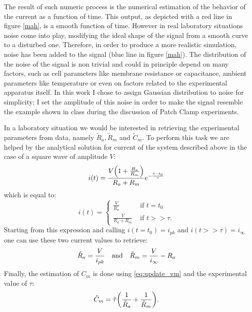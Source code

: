 \documentclass[a4paper]{article}
\begin{document}
The result of such numeric process is the numerical estimation of the behavior of the current as a function of time.
This output, as depicted with a red line in figure \ref{mah}, is a smooth function of time.
However in real laboratory situations noise come into play, modifying the ideal shape of the signal from a smooth curve to a disturbed one.
Therefore, in order to produce a more realistic simulation, noise has been added to the signal (blue line in figure \ref{mah}).
The distribution of the noise of the signal is non trivial and could in principle depend on many factors, such as cell parameters like membrane resistance or capacitance, ambient parameters like temperature or even on factors related to the experimental apparatus itself.
In this work I chose to assign Gaussian distribution to noise for simplicity; I set the amplitude of this noise in order to make the signal resemble the example shown in class during the discussion of Patch Clamp experiments.

In a laboratory situation we would be interested in retrieving the experimental parameters from data, namely $\tilde{R}_a, \tilde{R}_m$ and $\tilde{C}_m.$
To perform this task we are helped by the analytical solution for current of the system described above in the case of a square wave of amplitude $V$:
\begin{equation}
     i(t)=\frac{V\pqty{1+\frac{R_a}{R_m}}}{R_a+R_m} e^{-\frac{t-t_0}{\tau}}
 \end{equation} 
which is equal to:
\begin{equation}
i(t)=
    \begin{cases}
        \frac{V}{R_a} &\text{ if }t=t_0\\
        \frac{V}{R_a + R_m} &\text{ if } t>>\tau.
        
    \end{cases}
\end{equation}
Starting from this expression and calling $i(t=t_0)=i_{pk}$ and $i(t>>\tau) = i_\infty$ one can use these two current values to retrieve:
\begin{equation}
    \tilde{R}_a= \frac{V}{i_{pk}}\qq{and}\tilde{R}_m = \frac{V}{i_\infty} - R_a
    \label{eq:Ra_estimation}
\end{equation}
Finally, the estimation of $C_m$ is done using \eqref{eq:update_vm} and the experimental value of $\tau:$
\begin{equation}
    \tilde{C}_m = \tilde{\tau}\pqty{\frac{1}{\tilde{R}_a}+\frac{1}{\tilde{R}_m}}.
\end{equation}
\end{document}
